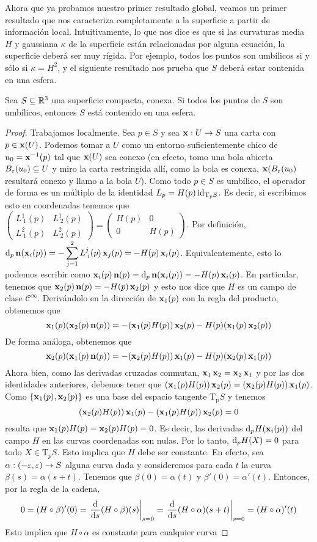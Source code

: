 Ahora que ya probamos nuestro primer resultado global, veamos un primer resultado que nos caracteriza completamente a la superficie a partir de información local. Intuitivamente, lo que nos dice es que si las curvaturas media $H$ y gaussiana $\kappa$ de la superficie están relacionadas por alguna ecuación, la superficie deberá ser muy rígida. Por ejemplo, todos los puntos son umbílicos si y sólo si $\kappa=H^2$, y el siguiente resultado nos prueba que $S$ deberá estar contenida en una esfera.

\begin{teo}
Sea $S\subseteq\mathbb{R}^3$ una superficie compacta, conexa. Si todos los puntos de $S$ son umbílicos, entonces $S$ está contenido en una esfera.
\begin{proof}
Trabajamos localmente. Sea $p\in S$ y sea $\operatorname{\mathbf{x}}:U\to S$ una carta con $p\in\operatorname{\mathbf{x}}(U)$. Podemos tomar a $U$ como un entorno suficientemente chico de $u_0=\operatorname{\mathbf{x}}^{-1}(p)$ tal que $\operatorname{\mathbf{x}}(U)$ sea conexo (en efecto, tomo una bola abierta $B_\varepsilon(u_0)\subseteq U$ y miro la carta restringida allí, como la bola es conexa, $\operatorname{\mathbf{x}}(B_\varepsilon(u_0)$ resultará conexo y llamo a la bola $U$).  Como todo $p\in S$ es umbílico, el operador de forma es un múltiplo de la identidad $L_p = H(p)\operatorname{id}_{\mathrm{T}_pS}$. Es decir, si escribimos esto en coordenadas tenemos que $\begin{pmatrix}L^1_{\;1}(p) & L^{1}_{\; 2}(p) \\ L^2_{\; 1}(p)& L^2_{\; 2}(p)\end{pmatrix} = \begin{pmatrix}H(p)& 0\\ 0 & H(p)\end{pmatrix}$. Por definición, $\mathop{}\!\mathrm{d}_p\operatorname{\mathbf{n}}(\operatorname{\mathbf{x}}_i(p)) = -\displaystyle\sum_{j=1}^2 L^j_{\; i}(p)\operatorname{\mathbf{x}}_j(p) = -H(p)\operatorname{\mathbf{x}}_i(p)$. Equivalentemente, esto lo podemos escribir como $\operatorname{\mathbf{x}}_i(p)\operatorname{\mathbf{n}}(p) = \mathop{}\!\mathrm{d}_p\operatorname{\mathbf{n}}(\operatorname{\mathbf{x}}_i(p)) = -H(p)\operatorname{\mathbf{x}}_i(p)$. En particular, tenemos que $\operatorname{\mathbf{x}}_2(p)\operatorname{\mathbf{n}}(p) = -H(p)\operatorname{\mathbf{x}}_2(p)$ y esto nos dice que $H$ es un campo de clase $\mathscr{C}^\infty$. Derivándolo en la dirección de $\operatorname{\mathbf{x}}_1(p)$ con la regla del producto, obtenemos que $$\operatorname{\mathbf{x}}_1(p)(\operatorname{\mathbf{x}}_2(p)\operatorname{\mathbf{n}}(p)) = -(\operatorname{\mathbf{x}}_1(p)H(p))\operatorname{\mathbf{x}}_2(p) - H(p) (\operatorname{\mathbf{x}}_1(p)\operatorname{\mathbf{x}}_2(p))$$ De forma análoga, obtenemos que $$\operatorname{\mathbf{x}}_2(p)(\operatorname{\mathbf{x}}_1(p)\operatorname{\mathbf{n}}(p)) = -(\operatorname{\mathbf{x}}_2(p)H(p))\operatorname{\mathbf{x}}_1(p) - H(p)(\operatorname{\mathbf{x}}_2(p)\operatorname{\mathbf{x}}_1(p))$$ Ahora bien, como las derivadas cruzadas conmutan, $\operatorname{\mathbf{x}}_1\operatorname{\mathbf{x}}_2=\operatorname{\mathbf{x}}_2\operatorname{\mathbf{x}}_1$ y por las dos identidades anteriores, debemos tener que $(\operatorname{\mathbf{x}}_1(p)H(p))\operatorname{\mathbf{x}}_2(p)=(\operatorname{\mathbf{x}}_2(p)H(p))\operatorname{\mathbf{x}}_1(p)$. Como $\{\operatorname{\mathbf{x}}_1(p),\operatorname{\mathbf{x}}_2(p)\}$ es una base del espacio tangente $\mathrm{T_p}S$ y tenemos $$(\operatorname{\mathbf{x}}_2(p)H(p))\operatorname{\mathbf{x}}_1(p) - (\operatorname{\mathbf{x}}_1(p)H(p))\operatorname{\mathbf{x}}_2(p) = 0$$ resulta que $\operatorname{\mathbf{x}}_1(p)H(p)=\operatorname{\mathbf{x}}_2(p)H(p)=0$. Es decir, las derivadas $\mathop{}\!\mathrm{d}_p H(\operatorname{\mathbf{x}}_i(p))$ del campo $H$ en las curvas coordenadas son nulas. Por lo tanto, $\mathop{}\!\mathrm{d}_p H(X)=0$ para todo $X\in\mathrm{T}_pS$. Esto implica que $H$ debe ser constante. En efecto, sea $\alpha:(-\varepsilon,\varepsilon)\to S$ alguna curva dada y consideremos para cada $t$ la curva $\beta(s)=\alpha(s+t)$. Tenemos que $\beta(0)=\alpha(t)$ y $\beta'(0)=\alpha'(t)$. Entonces, por la regla de la cadena, $$0=(H\circ\beta)'(0)=\left.\dfrac{\mathop{}\!\mathrm{d}}{\mathop{}\!\mathrm{d} s}(H\circ\beta)(s)\right|_{s=0} = \left.\dfrac{\mathop{}\!\mathrm{d}}{\mathop{}\!\mathrm{d} s}(H\circ\alpha)(s+t)\right|_{s=0} =  (H\circ\alpha)'(t)$$ Esto implica que $H\circ\alpha$ es constante para cualquier curva 
\end{proof}
\end{teo}
